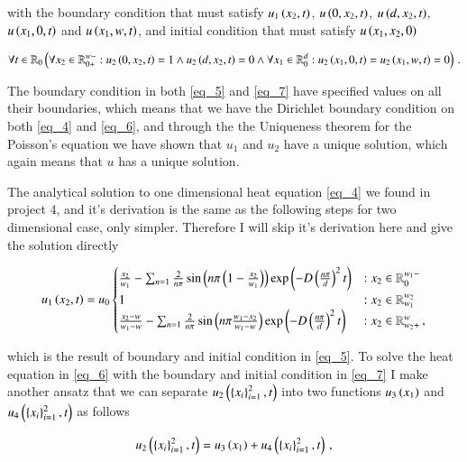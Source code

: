 \documentclass[11pt,english,a4paper]{article}
\begin{document}
\begin{flushleft}
with the boundary condition that must satisfy $u_1\left({x_2,t}\right)$, $u\left({0,x_2,t}\right)$, $u\left({d,x_2,t}\right)$, $u\left({x_1,0,t}\right)$ and $u\left({x_1,w,t}\right)$,  and initial condition that must satisfy $u\left({x_1,x_2,0}\right)$

\begin{align}
\forall t \in \mathbb{R}_0 \left({\forall x_2 \in \mathbb{R}_{0+}^{w-}: u_2\left({0,x_2,t}\right) = 1 \wedge u_2\left({d,x_2,t}\right)=0 \wedge \forall x_1\in \mathbb{R}_0^d: u_2\left({x_1,0,t}\right) = u_2\left({x_1,w,t}\right)= 0}\right) \,.
\label{eq_7}
\end{align}

The boundary condition in both \eqref{eq_5} and \eqref{eq_7} have specified values on all their boundaries, which means that we have the Dirichlet boundary condition on both \eqref{eq_4} and \eqref{eq_6}, and through the the Uniqueness theorem for the Poisson's equation we have shown that $u_1$ and $u_2$ have a unique solution, which again means that $u$ has a unique solution. \linebreak

The analytical solution to one dimensional heat equation \eqref{eq_4} we found in project 4, and it's derivation is the same as the following steps for two dimensional case, only simpler. Therefore I will skip it's derivation here and give the solution directly

\begin{align}
u_1\left({x_2,t}\right) = u_0 \begin{cases} \frac{x_2}{w_1} - \sum_{n=1} \frac{2}{n \pi} \sin\left({n\pi\left({1-\frac{x_2}{w_1}}\right)}\right)\exp\left({-D\left({\frac{n\pi}{d}}\right)^2 t}\right) &: x_2\in\mathbb{R}_0^{w_1-}\\ 1 &: x_2 \in\mathbb{R}_{w_1}^{w_2} \\  \frac{x_2-w}{w_1-w} - \sum_{n=1} \frac{2}{n \pi} \sin\left({n\pi\frac{w_1-x_2}{w_1-w}}\right)\exp\left({-D\left({\frac{n\pi}{d}}\right)^2 t}\right) & : x_2\in\mathbb{R}_{w_2+}^w \,,\end{cases}
\label{eq_8}
\end{align}

which is the result of boundary and initial condition in \eqref{eq_5}. To solve the heat equation in \eqref{eq_6} with the boundary and initial condition in \eqref{eq_7} I make another ansatz that we can separate $u_2\left({\left\lbrace{x_i}\right\rbrace_{i=1}^2,t}\right)$ into two functions $u_3\left({x_1}\right)$ and $u_4\left({\left\lbrace{x_i}\right\rbrace_{i=1}^2,t}\right)$ as follows

\begin{align}
u_2\left({\left\lbrace{x_i}\right\rbrace_{i=1}^2,t}\right) = u_3\left({x_1}\right) + u_4\left({\left\lbrace{x_i}\right\rbrace_{i=1}^2,t}\right) \,,
\label{eq_9}
\end{align}


\end{flushleft}
\end{document}
